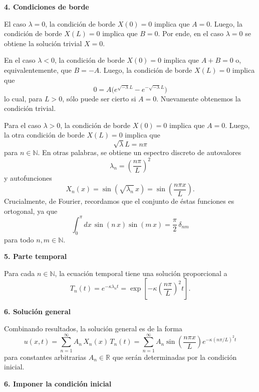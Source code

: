 \documentclass[11pt,spanish]{article}
\newcommand{\NN}{\mathbb{N}}
\newcommand{\RR}{\mathbb{R}}
\begin{document}
{\bf 4. Condiciones de borde}

El caso $\lambda=0$, la condici\'on de borde $X(0)=0$ implica que $A=0$.
Luego, la condici\'on de borde 
$X(L)=0$ implica que $B=0$.
Por ende, en el caso $\lambda=0$ se obtiene la soluci\'on trivial $X=0$.

En el caso $\lambda<0$, la condici\'on de borde $X(0)=0$ implica que $A+B=0$ o, equivalentemente, que $B=-A$.
Luego, la condici\'on de borde $X(L)=0$ implica que
$$
0 = 
A
\bigg(
e^{\sqrt{-\lambda}L}
-
e^{-\sqrt{-\lambda}L}
\bigg)
$$
lo cual, para $L>0$, s\'olo puede ser cierto si $A=0$.
Nuevamente obtenemos la condici\'on trivial.

Para el caso $\lambda>0$, la condici\'on de borde $X(0)=0$ implica que $A=0$.
Luego, la otra condici\'on de borde $X(L)=0$ implica que
$$
\sqrt{\lambda}L 
=
n\pi
$$
para $n\in \NN$.
En otras palabras, se obtiene un espectro discreto de autovalores
$$
\lambda_n=\left(\frac{n\pi}{L}\right)^2
$$
y autofunciones
$$
X_n(x)
=
\sin(\sqrt{\lambda_n}\,x)
=
\sin\left(\frac{n\pi x}{L}\right).
$$
Crucialmente, de Fourier, recordamos que el conjunto de \'estas funciones es ortogonal, ya que
$$
\int_0^{\pi}
dx\,
\sin(n\,x)
\sin(m\,x)
=
\frac{\pi}{2}\,
\delta_{nm}
$$
para todo $n,m\in \NN$.

{\bf 5. Parte temporal}

Para cada $n\in \NN$, la ecuaci\'on temporal tiene una soluci\'on proporcional a
$$
T_n(t)
=
e^{-\kappa \lambda_n t}
=
\exp\left[
-\kappa
\left(\frac{n\pi}{L}\right)^2
t
\right].
$$

{\bf 6. Solución general}

Combinando resultados, la solución general es de la forma
$$
u(x,t)
=
\sum_{n=1}^{\infty}
A_n\,
X_n(x)\,
T_n(t)
=
\sum_{n=1}^{\infty}
A_n
\sin\left(\frac{n\pi x}{L}\right)
e^{-\kappa (n\pi/L)^2 t}
$$
para constantes arbitrarias $A_n\in \RR$ que serán determinadas por la condici\'on inicial.

{\bf 6. Imponer la condición inicial}
\end{document}
